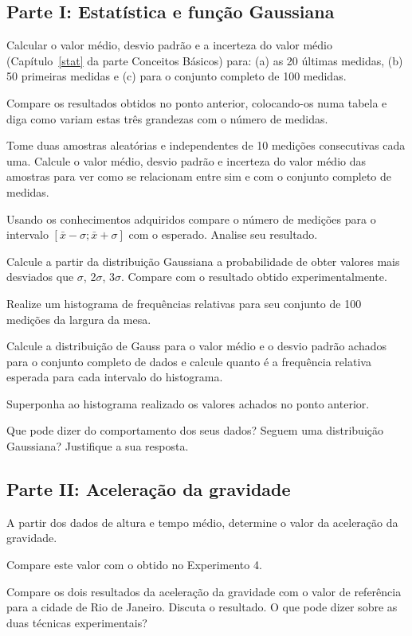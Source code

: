 \subsection*{Parte I: Estatística e função Gaussiana}
\begin{num}
\item Calcular o valor médio, desvio padrão e a incerteza do valor médio (Capítulo~\ref{stat} da parte Conceitos Básicos) para: (a) as 20 últimas medidas, (b) 50 primeiras medidas e (c) para o conjunto completo de 100 medidas.
\item Compare os resultados obtidos no ponto anterior, colocando-os numa tabela e diga como variam estas três grandezas com o número de medidas.
\item Tome duas amostras aleatórias e independentes de 10 medições consecutivas cada uma. Calcule o valor médio, desvio padrão e incerteza do valor médio das amostras para ver como se relacionam entre sim e com o conjunto completo de medidas.
\item Usando os conhecimentos adquiridos compare o número de medições para o intervalo $[\bar{x}-\sigma;\bar{x}+\sigma]$ com o esperado. Analise seu resultado.
\item Calcule a partir da distribuição Gaussiana a probabilidade de obter valores mais desviados
que $\sigma$, 2$\sigma$, 3$\sigma$. Compare com o resultado obtido experimentalmente.
\item Realize um histograma de frequências relativas para seu conjunto de 100 medições da largura da mesa.
\item Calcule a distribuição de Gauss para o valor médio e o desvio padrão achados para o conjunto completo de dados e calcule quanto é a frequência relativa esperada para cada intervalo do histograma.
\item Superponha ao histograma realizado os valores achados no ponto anterior.
\item Que pode dizer do comportamento dos seus dados? Seguem uma distribuição Gaussiana? Justifique a sua resposta.
\end{num}

\subsection*{Parte II: Aceleração da gravidade}
\begin{num}
\setcounter{enumi}{9}

\item A partir dos dados de altura e tempo médio, determine o valor da aceleração da gravidade.
\item Compare este valor com o obtido no Experimento 4. 
\item Compare os dois resultados da aceleração da gravidade com o valor de referência para a cidade de Rio de Janeiro.  Discuta o resultado. O que pode dizer sobre as duas técnicas experimentais?

\end{num}
